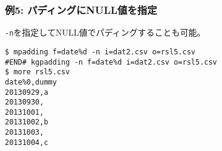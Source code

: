 \subsubsection*{例5: パディングにNULL値を指定}

\verb|-n|を指定してNULL値でパディングすることも可能。


\begin{Verbatim}[baselinestretch=0.7,frame=single]
$ mpadding f=date%d -n i=dat2.csv o=rsl5.csv
#END# kgpadding -n f=date%d i=dat2.csv o=rsl5.csv
$ more rsl5.csv
date%0,dummy
20130929,a
20130930,
20131001,
20131002,b
20131003,
20131004,c
\end{Verbatim}
